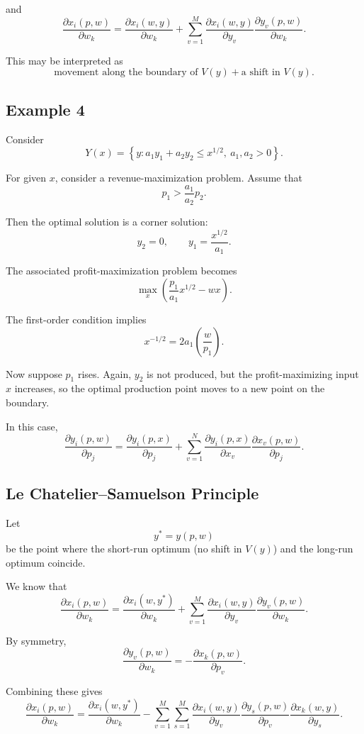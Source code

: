 and
\[
\frac{\partial x_i(p,w)}{\partial w_k}
=
\frac{\partial x_i(w,y)}{\partial w_k}
+
\sum_{v=1}^M
\frac{\partial x_i(w,y)}{\partial y_v}
\frac{\partial y_v(p,w)}{\partial w_k}.
\]

This may be interpreted as
\[
\text{movement along the boundary of } V(y)
+
\text{a shift in } V(y).
\]

\subsection*{Example 4}

Consider
\[
Y(x)=\left\{y : a_1 y_1 + a_2 y_2 \le x^{1/2},\ a_1,a_2>0\right\}.
\]

For given $x$, consider a revenue-maximization problem.
Assume that
\[
p_1 > \frac{a_1}{a_2} p_2.
\]

Then the optimal solution is a corner solution:
\[
y_2 = 0,
\qquad
y_1 = \frac{x^{1/2}}{a_1}.
\]

The associated profit-maximization problem becomes
\[
\max_x \left( \frac{p_1}{a_1} x^{1/2} - wx \right).
\]

The first-order condition implies
\[
x^{-1/2} = 2a_1 \left(\frac{w}{p_1}\right).
\]

Now suppose $p_1$ rises. Again, $y_2$ is not produced, but the
profit-maximizing input $x$ increases, so the optimal production point
moves to a new point on the boundary.

In this case,
\[
\frac{\partial y_i(p,w)}{\partial p_j}
=
\frac{\partial y_i(p,x)}{\partial p_j}
+
\sum_{v=1}^N
\frac{\partial y_i(p,x)}{\partial x_v}
\frac{\partial x_v(p,w)}{\partial p_j}.
\]

\subsection*{Le Chatelier--Samuelson Principle}

Let
\[
y^* = y(p,w)
\]
be the point where the short-run optimum
(no shift in $V(y)$) and the long-run optimum coincide.

We know that
\[
\frac{\partial x_i(p,w)}{\partial w_k}
=
\frac{\partial x_i(w,y^*)}{\partial w_k}
+
\sum_{v=1}^M
\frac{\partial x_i(w,y)}{\partial y_v}
\frac{\partial y_v(p,w)}{\partial w_k}.
\]

By symmetry,
\[
\frac{\partial y_v(p,w)}{\partial w_k}
=
-
\frac{\partial x_k(p,w)}{\partial p_v}.
\]

Combining these gives
\[
\frac{\partial x_i(p,w)}{\partial w_k}
=
\frac{\partial x_i(w,y^*)}{\partial w_k}
-
\sum_{v=1}^M \sum_{s=1}^M
\frac{\partial x_i(w,y)}{\partial y_v}
\frac{\partial y_s(p,w)}{\partial p_v}
\frac{\partial x_k(w,y)}{\partial y_s}.
\]


